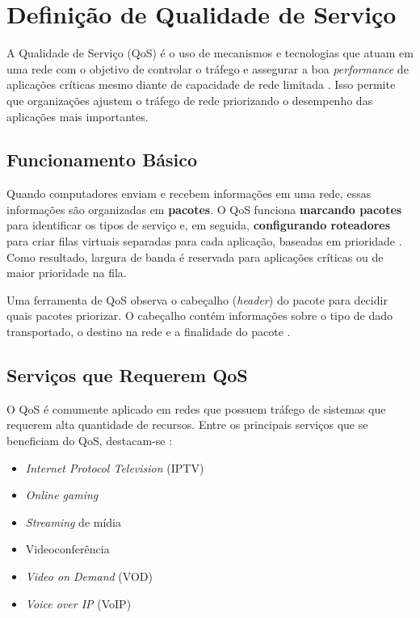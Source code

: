 \section{Definição de Qualidade de Serviço}

A Qualidade de Serviço (QoS) é o uso de mecanismos e tecnologias que atuam em
uma rede com o objetivo de controlar o tráfego e assegurar a boa
\textit{performance} de aplicações críticas mesmo diante de capacidade de rede
limitada \cite{fortinet2024}. Isso permite que organizações ajustem o tráfego de
rede priorizando o desempenho das aplicações mais importantes.

\subsection{Funcionamento Básico}

Quando computadores enviam e recebem informações em uma rede, essas informações
são organizadas em \textbf{pacotes}. O QoS funciona \textbf{marcando pacotes}
para identificar os tipos de serviço e, em seguida, \textbf{configurando
roteadores} para criar filas virtuais separadas para cada aplicação, baseadas em
prioridade \cite{fortinet2024}. Como resultado, largura de banda é reservada para
aplicações críticas ou de maior prioridade na fila.

Uma ferramenta de QoS observa o cabeçalho (\textit{header}) do pacote para
decidir quais pacotes priorizar. O cabeçalho contém informações sobre o tipo de
dado transportado, o destino na rede e a finalidade do pacote
\cite{techtarget2024}.

\subsection{Serviços que Requerem QoS}

O QoS é comumente aplicado em redes que possuem tráfego de sistemas que requerem
alta quantidade de recursos. Entre os principais serviços que se beneficiam do
QoS, destacam-se \cite{fortinet2024}:

\begin{itemize}
  \item \textit{Internet Protocol Television} (IPTV)
  \item \textit{Online gaming}
  \item \textit{Streaming} de mídia
  \item Videoconferência
  \item \textit{Video on Demand} (VOD)
  \item \textit{Voice over IP} (VoIP)
\end{itemize}

